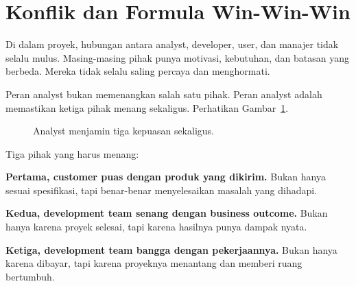 \documentclass[11pt,a4paper]{article}
\begin{document}
\section{Konflik dan Formula Win-Win-Win}

Di dalam proyek, hubungan antara analyst, developer, user, dan manajer tidak selalu mulus. Masing-masing pihak punya motivasi, kebutuhan, dan batasan yang berbeda. Mereka tidak selalu saling percaya dan menghormati.

Peran analyst bukan memenangkan salah satu pihak. Peran analyst adalah memastikan ketiga pihak menang sekaligus. Perhatikan Gambar~\ref{fig:winwinwin}.

\begin{figure}[H]
	\centering
	\caption{Analyst menjamin tiga kepuasan sekaligus.}
	\label{fig:winwinwin}
\end{figure}

Tiga pihak yang harus menang:

\textbf{Pertama, customer puas dengan produk yang dikirim.} Bukan hanya sesuai spesifikasi, tapi benar-benar menyelesaikan masalah yang dihadapi.

\textbf{Kedua, development team senang dengan business outcome.} Bukan hanya karena proyek selesai, tapi karena hasilnya punya dampak nyata.

\textbf{Ketiga, development team bangga dengan pekerjaannya.} Bukan hanya karena dibayar, tapi karena proyeknya menantang dan memberi ruang bertumbuh.
\end{document}
